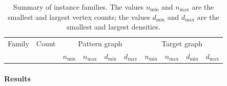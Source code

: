 \begin{table}[htb]
\centering
\footnotesize
    \begin{tabular}{lrrrrrrrrr}
 \toprule
        Family & Count & \multicolumn{4}{c}{Pattern graph} & \multicolumn{4}{c}{Target graph} \\
     \cmidrule(r){3-6}
     \cmidrule(r){7-10}
             & & $n_{\min{}}$ & $n_{\max{}}$ & $d_{\min{}}$ & $d_{\max{}}$
            & $n_{\min{}}$ & $n_{\max{}}$ & $d_{\min{}}$ & $d_{\max{}}$
            \\ [0.5ex]
 \midrule
        
 \bottomrule
\end{tabular}
    \caption{Summary of instance families. The values $n_{\min{}}$ and $n_{\max{}}$
            are the smallest and largest vertex counts; the values $d_{\min{}}$ and $d_{\max{}}$
            are the smallest and largest densities.}
\label{tab:instance-family-summary}
\end{table}

\paragraph*{Results}

